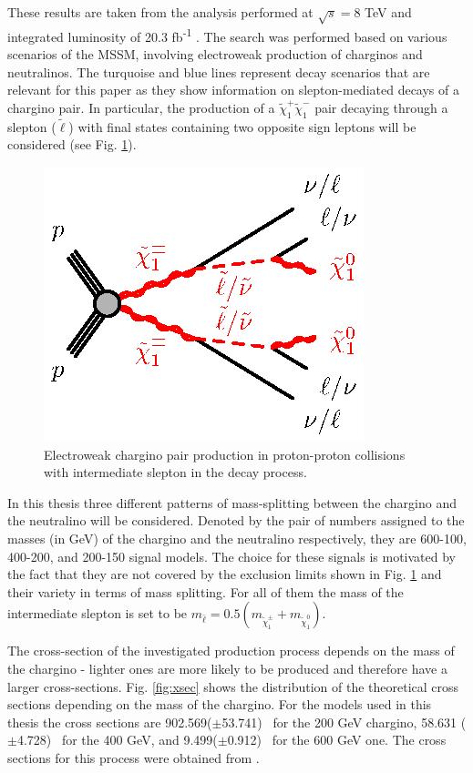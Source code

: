 These results are taken from the  analysis performed at $\sqrt{s}=$8 TeV and integrated luminosity of 20.3 fb\textsuperscript{-1} \citep{atlas2015search}. The search was performed based on various scenarios of the MSSM, involving electroweak production of charginos and neutralinos. The turquoise and blue lines represent decay scenarios that are relevant for this paper as they show information on slepton-mediated decays of a chargino pair. 
In particular, the production of a  $\tilde{\chi}^{+}_{1}\tilde{\chi}^{-}_{1}$ pair decaying through a slepton ($\tilde{\ell}$) with final states containing two opposite sign leptons will be considered (see Fig. \ref{fig:EWchargino}). 
\begin{figure}[!h]
  \centering   	
  	\captionsetup{width=0.8\textwidth}
	\includegraphics[]{Chap2/C1C1-llvvN1N1-slsnu}	
\caption[Feynman diagram of slepton-mediated chargino decay]{Electroweak chargino pair production in proton-proton collisions with intermediate slepton in the decay process.}\label{fig:EWchargino}
\end{figure}  

In this thesis three different patterns of mass-splitting between the chargino and the neutralino will be considered. Denoted by the pair of numbers assigned to the masses (in GeV) of the chargino and the neutralino respectively, they are 600-100, 400-200, and 200-150 signal models. The choice for these signals is motivated by the fact that they are not covered by the exclusion limits shown in Fig. \ref{fig:EWchargino} and their variety in terms of mass splitting.
For all of them the mass of the intermediate slepton is set to be $m_{\bar{\ell}} = 0.5(m_{\tilde{\chi}_1^{\pm}}+m_{\tilde{\chi}_1^{0}})$. 

The cross-section of the investigated production process depends on the mass of the chargino - lighter ones are more likely to be produced and therefore have a larger cross-sections. Fig. \ref{fig:xsec} shows the distribution of the theoretical cross sections depending on the mass of the chargino. For the models used in this thesis the cross sections are 902.569($\pm$53.741) \invfb \, for the 200 GeV chargino, 58.631 ($\pm$4.728)  \invfb \, for the 400 GeV, and 9.499($\pm$0.912) \invfb \, for the 600 GeV one.
The cross sections for this process were obtained from \citep{Fuks:2012qx,Fuks:2013vua}. 

